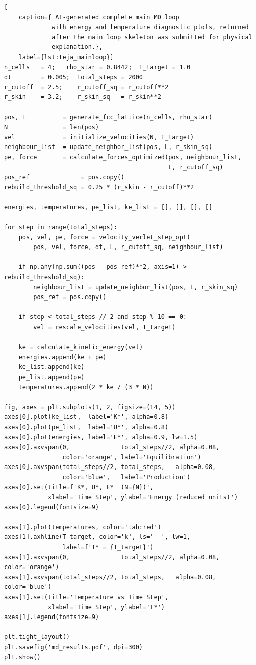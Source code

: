 \begin{lstlisting}[
    caption={ AI-generated complete main MD loop
             with energy and temperature diagnostic plots, returned
             after the main loop skeleton was submitted for physical
             explanation.},
    label={lst:teja_mainloop}]
n_cells   = 4;   rho_star = 0.8442;  T_target = 1.0
dt        = 0.005;  total_steps = 2000
r_cutoff  = 2.5;    r_cutoff_sq = r_cutoff**2
r_skin    = 3.2;    r_skin_sq   = r_skin**2
 
pos, L          = generate_fcc_lattice(n_cells, rho_star)
N               = len(pos)
vel             = initialize_velocities(N, T_target)
neighbour_list  = update_neighbor_list(pos, L, r_skin_sq)
pe, force       = calculate_forces_optimized(pos, neighbour_list,
                                             L, r_cutoff_sq)
pos_ref              = pos.copy()
rebuild_threshold_sq = 0.25 * (r_skin - r_cutoff)**2
 
energies, temperatures, pe_list, ke_list = [], [], [], []
 
for step in range(total_steps):
    pos, vel, pe, force = velocity_verlet_step_opt(
        pos, vel, force, dt, L, r_cutoff_sq, neighbour_list)
 
    if np.any(np.sum((pos - pos_ref)**2, axis=1) > rebuild_threshold_sq):
        neighbour_list = update_neighbor_list(pos, L, r_skin_sq)
        pos_ref = pos.copy()
 
    if step < total_steps // 2 and step % 10 == 0:
        vel = rescale_velocities(vel, T_target)
 
    ke = calculate_kinetic_energy(vel)
    energies.append(ke + pe)
    ke_list.append(ke)
    pe_list.append(pe)
    temperatures.append(2 * ke / (3 * N))
 
fig, axes = plt.subplots(1, 2, figsize=(14, 5))
axes[0].plot(ke_list,  label='K*', alpha=0.8)
axes[0].plot(pe_list,  label='U*', alpha=0.8)
axes[0].plot(energies, label='E*', alpha=0.9, lw=1.5)
axes[0].axvspan(0,              total_steps//2, alpha=0.08,
                color='orange', label='Equilibration')
axes[0].axvspan(total_steps//2, total_steps,   alpha=0.08,
                color='blue',   label='Production')
axes[0].set(title=f'K*, U*, E*  (N={N})',
            xlabel='Time Step', ylabel='Energy (reduced units)')
axes[0].legend(fontsize=9)
 
axes[1].plot(temperatures, color='tab:red')
axes[1].axhline(T_target, color='k', ls='--', lw=1,
                label=f'T* = {T_target}')
axes[1].axvspan(0,              total_steps//2, alpha=0.08, color='orange')
axes[1].axvspan(total_steps//2, total_steps,   alpha=0.08, color='blue')
axes[1].set(title='Temperature vs Time Step',
            xlabel='Time Step', ylabel='T*')
axes[1].legend(fontsize=9)
 
plt.tight_layout()
plt.savefig('md_results.pdf', dpi=300)
plt.show()
\end{lstlisting}

